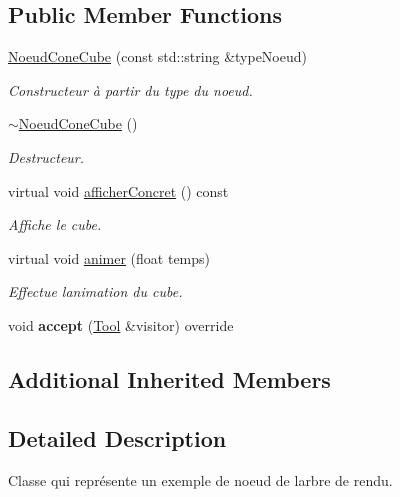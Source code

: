 \subsection*{Public Member Functions}
\begin{DoxyCompactItemize}
\item 
\hyperlink{group__inf2990_ga6f0bcd8b494e8aa6f3a8dad78bad2c0f}{Noeud\+Cone\+Cube} (const std\+::string \&type\+Noeud)
\begin{DoxyCompactList}\small\item\em Constructeur à partir du type du noeud. \end{DoxyCompactList}\item 
\hyperlink{group__inf2990_ga8db4b36c3469001f7dcfab23debe7d2f}{$\sim$\+Noeud\+Cone\+Cube} ()
\begin{DoxyCompactList}\small\item\em Destructeur. \end{DoxyCompactList}\item 
virtual void \hyperlink{group__inf2990_ga4b1f68c409f0b1c5eabd0be7822a36d2}{afficher\+Concret} () const 
\begin{DoxyCompactList}\small\item\em Affiche le cube. \end{DoxyCompactList}\item 
\hypertarget{group__inf2990_ga3472a200d45ce3cdff72d72921807b21}{}virtual void \hyperlink{group__inf2990_ga3472a200d45ce3cdff72d72921807b21}{animer} (float temps)\label{group__inf2990_ga3472a200d45ce3cdff72d72921807b21}

\begin{DoxyCompactList}\small\item\em Effectue l\textquotesingle{}animation du cube. \end{DoxyCompactList}\item 
\hypertarget{class_noeud_cone_cube_a057b05f07c3aef977e295b519969ae04}{}void {\bfseries accept} (\hyperlink{class_tool}{Tool} \&visitor) override\label{class_noeud_cone_cube_a057b05f07c3aef977e295b519969ae04}

\end{DoxyCompactItemize}
\subsection*{Additional Inherited Members}


\subsection{Detailed Description}
Classe qui représente un exemple de noeud de l\textquotesingle{}arbre de rendu. 

